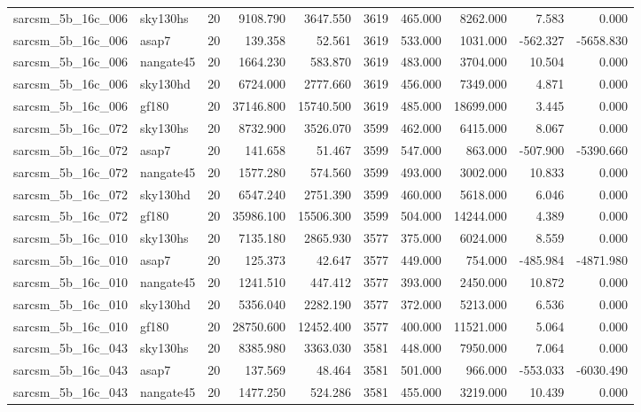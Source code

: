 \begin{tabular}{llrrrrrrrr}
sarcsm\_5b\_16c\_006 & sky130hs & 20 & 9108.790 & 3647.550 & 3619 & 465.000 & 8262.000 & 7.583 & 0.000 \\
sarcsm\_5b\_16c\_006 & asap7 & 20 & 139.358 & 52.561 & 3619 & 533.000 & 1031.000 & -562.327 & -5658.830 \\
sarcsm\_5b\_16c\_006 & nangate45 & 20 & 1664.230 & 583.870 & 3619 & 483.000 & 3704.000 & 10.504 & 0.000 \\
sarcsm\_5b\_16c\_006 & sky130hd & 20 & 6724.000 & 2777.660 & 3619 & 456.000 & 7349.000 & 4.871 & 0.000 \\
sarcsm\_5b\_16c\_006 & gf180 & 20 & 37146.800 & 15740.500 & 3619 & 485.000 & 18699.000 & 3.445 & 0.000 \\
sarcsm\_5b\_16c\_072 & sky130hs & 20 & 8732.900 & 3526.070 & 3599 & 462.000 & 6415.000 & 8.067 & 0.000 \\
sarcsm\_5b\_16c\_072 & asap7 & 20 & 141.658 & 51.467 & 3599 & 547.000 & 863.000 & -507.900 & -5390.660 \\
sarcsm\_5b\_16c\_072 & nangate45 & 20 & 1577.280 & 574.560 & 3599 & 493.000 & 3002.000 & 10.833 & 0.000 \\
sarcsm\_5b\_16c\_072 & sky130hd & 20 & 6547.240 & 2751.390 & 3599 & 460.000 & 5618.000 & 6.046 & 0.000 \\
sarcsm\_5b\_16c\_072 & gf180 & 20 & 35986.100 & 15506.300 & 3599 & 504.000 & 14244.000 & 4.389 & 0.000 \\
sarcsm\_5b\_16c\_010 & sky130hs & 20 & 7135.180 & 2865.930 & 3577 & 375.000 & 6024.000 & 8.559 & 0.000 \\
sarcsm\_5b\_16c\_010 & asap7 & 20 & 125.373 & 42.647 & 3577 & 449.000 & 754.000 & -485.984 & -4871.980 \\
sarcsm\_5b\_16c\_010 & nangate45 & 20 & 1241.510 & 447.412 & 3577 & 393.000 & 2450.000 & 10.872 & 0.000 \\
sarcsm\_5b\_16c\_010 & sky130hd & 20 & 5356.040 & 2282.190 & 3577 & 372.000 & 5213.000 & 6.536 & 0.000 \\
sarcsm\_5b\_16c\_010 & gf180 & 20 & 28750.600 & 12452.400 & 3577 & 400.000 & 11521.000 & 5.064 & 0.000 \\
sarcsm\_5b\_16c\_043 & sky130hs & 20 & 8385.980 & 3363.030 & 3581 & 448.000 & 7950.000 & 7.064 & 0.000 \\
sarcsm\_5b\_16c\_043 & asap7 & 20 & 137.569 & 48.464 & 3581 & 501.000 & 966.000 & -553.033 & -6030.490 \\
sarcsm\_5b\_16c\_043 & nangate45 & 20 & 1477.250 & 524.286 & 3581 & 455.000 & 3219.000 & 10.439 & 0.000 \\

\end{tabular}
